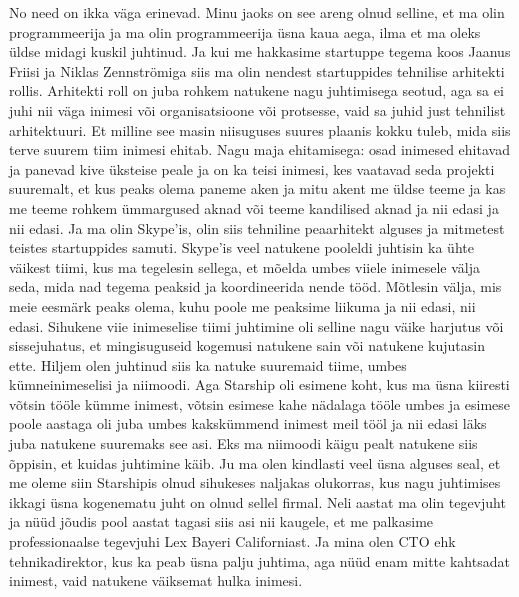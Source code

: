 
No need on ikka väga erinevad. Minu jaoks on see areng olnud selline, et ma 
olin programmeerija ja ma olin programmeerija üsna kaua aega, ilma et ma oleks 
üldse midagi kuskil juhtinud. Ja kui me hakkasime startuppe tegema koos Jaanus 
Friisi ja Niklas Zennströmiga siis ma olin 
nendest startuppides tehnilise arhitekti rollis. Arhitekti roll on juba rohkem 
natukene nagu  juhtimisega seotud, aga sa ei juhi nii väga  inimesi või 
organisatsioone või protsesse, vaid sa juhid just tehnilist arhitektuuri. Et 
milline see masin niisuguses suures plaanis kokku tuleb, mida siis terve suurem 
tiim inimesi ehitab. Nagu maja ehitamisega: osad inimesed ehitavad ja panevad 
kive üksteise peale ja on ka teisi inimesi, kes vaatavad seda projekti 
suuremalt, et kus peaks olema paneme aken ja mitu akent me üldse teeme ja kas 
me teeme rohkem ümmargused aknad või teeme kandilised aknad ja nii edasi ja nii 
edasi. Ja ma olin Skype'is, olin siis tehniline peaarhitekt alguses  ja 
mitmetest teistes startuppides samuti. Skype'is veel natukene pooleldi juhtisin 
ka ühte väikest tiimi, kus  ma tegelesin sellega, et mõelda umbes viiele 
inimesele välja seda, mida nad tegema peaksid ja koordineerida nende tööd. 
Mõtlesin välja, mis meie eesmärk peaks olema, kuhu poole me peaksime liikuma ja 
nii edasi, nii edasi. Sihukene viie inimeselise tiimi juhtimine oli selline 
nagu väike harjutus või  sissejuhatus, et mingisuguseid kogemusi natukene sain 
või natukene kujutasin ette. Hiljem olen juhtinud siis ka natuke suuremaid 
tiime, umbes kümneinimeselisi ja niimoodi. Aga Starship oli esimene koht, kus 
ma üsna kiiresti võtsin tööle kümme inimest, võtsin esimese kahe nädalaga tööle 
umbes ja esimese poole aastaga oli juba umbes kakskümmend inimest meil tööl ja 
nii edasi  läks juba natukene suuremaks see asi. Eks ma niimoodi käigu pealt 
natukene siis  õppisin, et  kuidas juhtimine käib. Ju ma olen kindlasti veel 
üsna  alguses seal, et me oleme siin Starshipis olnud sihukeses  naljakas 
olukorras, kus nagu juhtimises ikkagi üsna kogenematu juht on olnud sellel 
firmal. Neli aastat ma olin tegevjuht ja  nüüd jõudis pool aastat tagasi siis 
asi nii kaugele, et me palkasime  professionaalse tegevjuhi Lex 
Bayeri Californiast. Ja mina olen CTO ehk 
tehnikadirektor, kus ka peab üsna palju juhtima, aga nüüd enam mitte kahtsadat 
inimest, vaid natukene väiksemat hulka inimesi.

